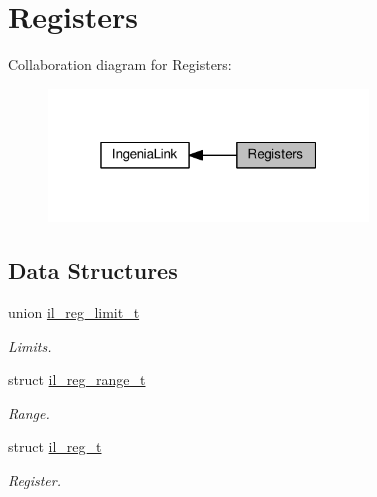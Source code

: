 \hypertarget{group__IL__REGS}{}\section{Registers}
\label{group__IL__REGS}
Collaboration diagram for Registers\+:\nopagebreak
\begin{figure}[H]
\begin{center}
\leavevmode
\includegraphics[width=241pt]{group__IL__REGS}
\end{center}
\end{figure}
\subsection*{Data Structures}
\begin{DoxyCompactItemize}
\item 
union \hyperlink{unionil__reg__limit__t}{il\+\_\+reg\+\_\+limit\+\_\+t}
\begin{DoxyCompactList}\small\item\em Limits. \end{DoxyCompactList}\item 
struct \hyperlink{structil__reg__range__t}{il\+\_\+reg\+\_\+range\+\_\+t}
\begin{DoxyCompactList}\small\item\em Range. \end{DoxyCompactList}\item 
struct \hyperlink{structil__reg__t}{il\+\_\+reg\+\_\+t}
\begin{DoxyCompactList}\small\item\em Register. \end{DoxyCompactList}\end{DoxyCompactItemize}
